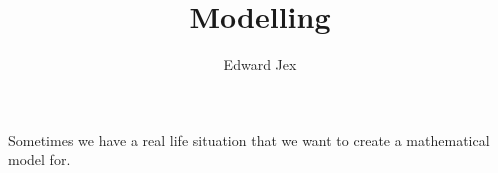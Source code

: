 \documentclass[a4paper,12pt]{article}
\begin{document}
\title{Modelling}	
\author{Edward Jex}
\maketitle
Sometimes we have a real life situation that we want to create a mathematical model for. 
\end{document}
